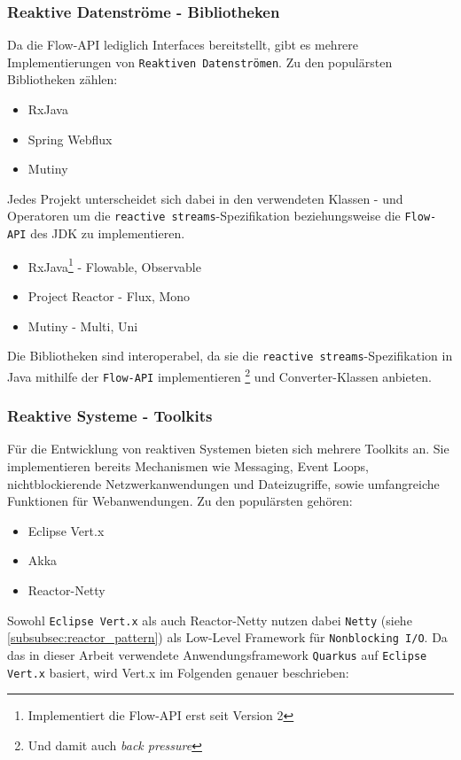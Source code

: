 \subsubsection{Reaktive Datenströme - Bibliotheken}
\label{subsubsec:reactive_streams}
Da die Flow-API lediglich Interfaces bereitstellt, gibt es mehrere Implementierungen von \verb|Reaktiven Datenströmen|.
Zu den populärsten Bibliotheken zählen:
\begin{itemize}
	\item RxJava
	\item Spring Webflux
	\item Mutiny
\end{itemize}
Jedes Projekt unterscheidet sich dabei in den verwendeten Klassen - und Operatoren um die \verb|reactive streams|-Spezifikation
beziehungsweise die \verb|Flow-API| des JDK zu implementieren.
\begin{itemize}
	\item RxJava\footnote{Implementiert die Flow-API erst seit Version 2} - Flowable, Observable \parencite{RxJava}
	\item Project Reactor - Flux, Mono \parencite{ProjectReactor}
	\item Mutiny - Multi, Uni \parencite{Mutiny}
\end{itemize}

Die Bibliotheken sind interoperabel, da sie die \verb|reactive streams|-Spezifikation in Java mithilfe der \verb|Flow-API|
implementieren \footnote{Und damit auch \textit{back pressure}} und Converter-Klassen anbieten.

\subsubsection{Reaktive Systeme - Toolkits}
\label{subsubsec:reaktive_systeme}
Für die Entwicklung von reaktiven Systemen bieten sich mehrere Toolkits an.
Sie implementieren bereits Mechanismen wie Messaging, Event Loops,
nichtblockierende Netzwerkanwendungen und Dateizugriffe, sowie umfangreiche Funktionen für Webanwendungen.
Zu den populärsten gehören:
\begin{itemize}
	\item Eclipse Vert.x
	\item Akka
	\item Reactor-Netty
\end{itemize}\parencite{Vert.x, Akka, ProjectReactor}
Sowohl \verb|Eclipse Vert.x| als auch Reactor-Netty nutzen dabei \verb|Netty|
(siehe \ref{subsubsec:reactor_pattern}) als Low-Level Framework für \verb|Nonblocking I/O|.
Da das in dieser Arbeit verwendete Anwendungsframework \verb|Quarkus| auf \verb|Eclipse Vert.x| basiert, wird Vert.x im Folgenden genauer beschrieben:

